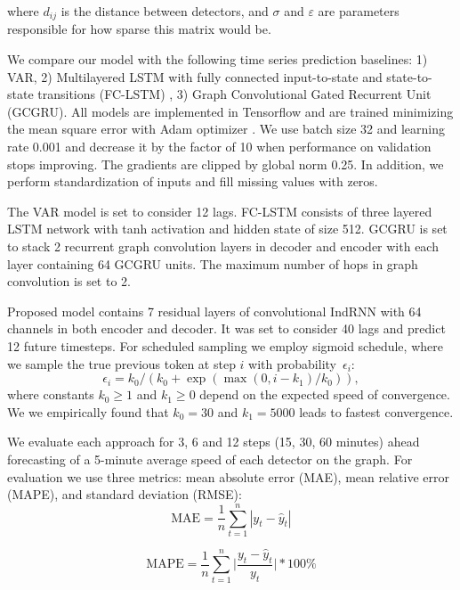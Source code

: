 \documentclass[letterpaper, 10 pt, conference]{ieeeconf}  %
\begin{document}
where $d_{ij}$ is the distance between detectors, and $\sigma$ and $\varepsilon$ are parameters responsible for how sparse this matrix would be.

We compare our model with the following time series prediction baselines: 1) VAR, 2) Multilayered LSTM with fully connected input-to-state and state-to-state transitions (FC-LSTM) \cite{Sutskever2014}, 3) Graph Convolutional Gated Recurrent Unit (GCGRU).
All models are implemented in Tensorflow \cite{tensorflow2015-whitepaper} and are trained minimizing the mean square error with Adam optimizer \cite{Kingma2015}. We use batch size 32 and learning rate 0.001 and decrease it by the factor of 10 when performance on validation stops improving. The gradients are clipped by global norm 0.25. In addition, we perform standardization of inputs and fill missing values with zeros.

The VAR model is set to consider 12 lags. FC-LSTM consists of three layered LSTM network with tanh activation and hidden state of size 512. GCGRU is set to stack 2 recurrent graph convolution layers in decoder and encoder with each layer containing 64 GCGRU units. The maximum number of hops in graph convolution is set to 2.

Proposed model contains 7 residual layers of convolutional IndRNN with 64 channels in both encoder and decoder. It was set to consider 40 lags and predict 12 future timesteps. For scheduled sampling we employ sigmoid schedule, where we sample the true previous token at step $i$ with probability~$\epsilon_i$:
\begin{equation}
    \epsilon_i = k_0/(k_0+\exp(\max(0,i - k_1)/k_0)),
\end{equation}
where constants $k_0 \ge 1$ and $k_1 \ge 0$ depend on the expected speed of convergence. We we empirically found that $k_0 = 30$ and $k_1 = 5000$ leads to fastest convergence. 
 
We evaluate each approach for 3, 6 and 12 steps (15, 30, 60 minutes) ahead forecasting of a 5-minute average speed of each detector on the graph. For evaluation we use three metrics: mean absolute error (MAE), mean relative error (MAPE), and standard deviation (RMSE):
\begin{equation}
    \text{MAE} = \frac{1}{n}\sum_{t=1}^n |y_t - \hat{y}_t|
\end{equation}

\begin{equation}
    \text{MAPE} = \frac{1}{n}\sum_{t=1}^n \bigg|\dfrac{y_t - \hat{y}_t}{y_t}\bigg| * 100\%
\end{equation}
\end{document}
